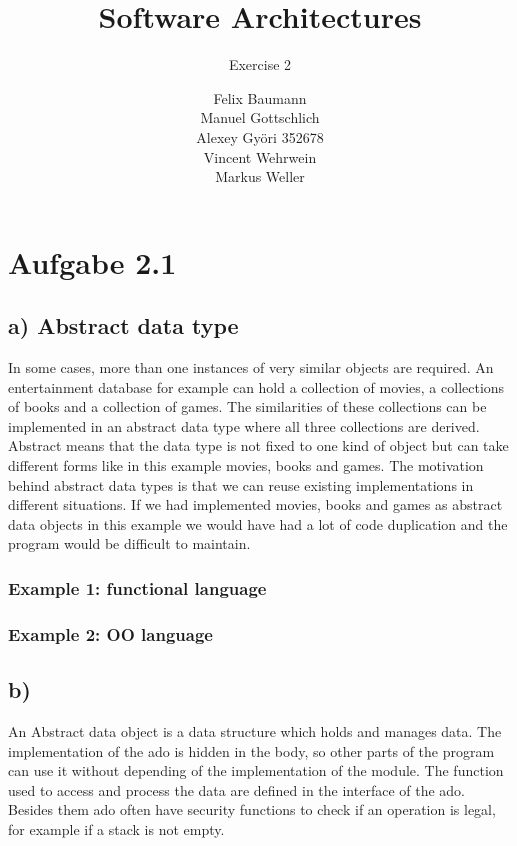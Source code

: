 \documentclass[a4paper,10pt]{scrartcl}[2003/01/01]
\title{Software Architectures}
\subtitle{Exercise 2}
\author{ Felix Baumann \\ Manuel Gottschlich \\  Alexey Gy\"ori 352678 \\ Vincent Wehrwein \\ Markus Weller}
\begin{document}
	\maketitle
	
	\section*{Aufgabe 2.1}
	\subsection*{a) Abstract data type}
	In some cases, more than one instances of very similar objects are required. An  entertainment database for example can hold a collection of movies, a collections of books and a collection of games. The similarities of these collections can be implemented in an abstract data type where all three collections are derived. Abstract means that the data type is not fixed to one kind of object but can take different forms like in this example movies, books and games. The motivation behind abstract data types is that we can reuse existing implementations in different situations. If we had implemented movies, books and games as abstract data objects in this example we would have had a lot of code duplication and the program would be difficult to maintain.
	
	\subsubsection*{Example 1: functional language}
	
	
	\subsubsection*{Example 2: OO language}
	
	
	
	\subsection*{b)}
	An Abstract data object is a data structure which holds and manages data. The implementation of the ado is hidden in the body, so other parts of the program can use it without depending of the implementation of the module. The function used to access and process the data are defined in the interface of the ado. Besides them ado often have security functions to check if an operation is legal, for example if a stack is not empty. 
	
\end{document}
